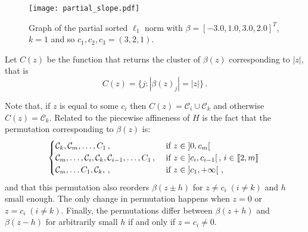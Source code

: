 \begin{figure}[htbp]
  \centering
  \texttt{[image: partial\_slope.pdf]}
  \caption{Graph of the partial sorted $\ell_1$ norm with \(\beta = [-3.0, 1.0, 3.0, 2.0]^T\), \(k = 1\) and so $c_1, c_2, c_3 = (3, 2, 1)$.}
  \label{fig:partial_slope}
\end{figure}

Let \(C(z)\) be the function that returns the cluster of $\beta(z)$ corresponding to \(|z|\), that is
\begin{equation}
  C(z) = \{j : |\beta(z)_j| = |z|\} \,.
\end{equation}



\begin{remark}\label{rem:permutation_C_z}
  Note that, if $z$ is equal to some $c_i$ then $C(z) = \mathcal{C}_i \cup \mathcal{C}_k$ and otherwise $C(z) = \mathcal{C}_k$.
  Related to the piecewise affineness of $H$ is the fact that the permutation corresponding to $\beta(z)$ is:
  \begin{equation*}
    \begin{cases}
    \mathcal{C}_k, \mathcal{C}_m, \ldots, C_1 \, ,
        &\text{ if } z \in \left]0, c_m\right[ \, \\
    \mathcal{C}_m, \ldots ,\mathcal{C}_i, \mathcal{C}_k, \mathcal{C}_{i-1}, \ldots, C_1 \, ,
        &\text{ if } z \in \left]c_{i}, c_{i-1} \right[, \, i \in \llbracket 2 , m \rrbracket \, \\
    \mathcal{C}_m, \ldots C_1,  \mathcal{C}_k, \, ,
        &\text{ if } z \in \left]c_1, +\infty \right[ \, , \\
    \end{cases}
  \end{equation*}
  and that this permutation also reorders $\beta(z \pm h)$ for $z \neq c_i \; (i \neq k)$ and $h$ small enough.
  The only change in permutation happens when $z = 0$ or $z = c_i \; (i \neq k)$.
  Finally, the permutations differ between $\beta(z + h)$ and $\beta(z - h)$ for arbitrarily small $h$ if and only if $z = c_i \neq 0$.
\end{remark}

